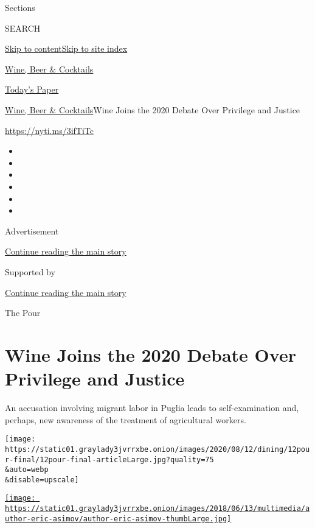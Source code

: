 Sections

SEARCH

\protect\hyperlink{site-content}{Skip to
content}\protect\hyperlink{site-index}{Skip to site index}

\href{https://www.nytimes3xbfgragh.onion/section/food/drinks}{Wine, Beer
\& Cocktails}

\href{https://myaccount.nytimes3xbfgragh.onion/auth/login?response_type=cookie\&client_id=vi}{}

\href{https://www.nytimes3xbfgragh.onion/section/todayspaper}{Today's
Paper}

\href{/section/food/drinks}{Wine, Beer \& Cocktails}\textbar{}Wine Joins
the 2020 Debate Over Privilege and Justice

\url{https://nyti.ms/3ifTiTc}

\begin{itemize}
\item
\item
\item
\item
\item
\item
\end{itemize}

Advertisement

\protect\hyperlink{after-top}{Continue reading the main story}

Supported by

\protect\hyperlink{after-sponsor}{Continue reading the main story}

The Pour

\hypertarget{wine-joins-the-2020-debate-over-privilege-and-justice}{%
\section{Wine Joins the 2020 Debate Over Privilege and
Justice}\label{wine-joins-the-2020-debate-over-privilege-and-justice}}

An accusation involving migrant labor in Puglia leads to
self-examination and, perhaps, new awareness of the treatment of
agricultural workers.

\texttt{[image: https://static01.graylady3jvrrxbe.onion/images/2020/08/12/dining/12pour-final/12pour-final-articleLarge.jpg?quality=75\\\&auto=webp\\\&disable=upscale]}

\href{https://www.nytimes3xbfgragh.onion/by/eric-asimov}{\texttt{[image: https://static01.graylady3jvrrxbe.onion/images/2018/06/13/multimedia/author-eric-asimov/author-eric-asimov-thumbLarge.jpg]}}

